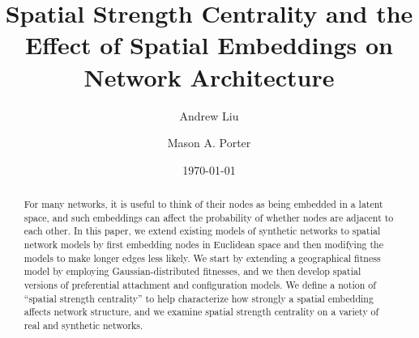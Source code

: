 \documentclass[%
 reprint,
 amsmath,amssymb,
 aps,
]{revtex4-1}
\begin{document}



\title{Spatial Strength Centrality and the Effect of Spatial Embeddings on Network Architecture}

\author{Andrew Liu}
%

\author{Mason A. Porter}
%

\date{\today}%

\begin{abstract}

For many networks, it is useful to think of their nodes as being embedded in a latent space, and such embeddings can affect the probability of whether nodes are adjacent to each other. In this paper, we extend existing models of synthetic networks to spatial network models by 
first embedding nodes in Euclidean space and then modifying the models to make longer edges less likely. We start by extending a geographical fitness model by employing Gaussian-distributed fitnesses, and we then develop spatial versions of preferential attachment and configuration models. We define a notion of ``spatial strength centrality'' to help characterize how strongly a spatial embedding affects network structure, and we examine spatial strength centrality on a variety of real and synthetic networks.

\end{abstract}

\maketitle


\end{document}
